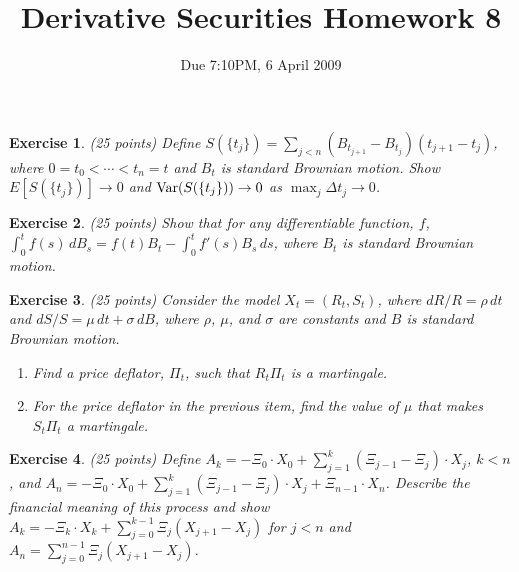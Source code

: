 \documentclass[11pt,fleqn]{amsproc}
\newcommand{\Var}{\mathop{\rm{Var}}}
\newtheorem{xca}{Exercise}
\begin{document}
\title{Derivative Securities Homework 8}
\author{Due 7:10PM, 6 April 2009}

\maketitle

\begin{xca}{(25 points)}
Define $S(\{t_j\}) = \sum_{j<n}(B_{t_{j+1}} - B_{t_j})(t_{j+1} - t_j)$, where $0 = t_0 < \cdots < t_n = t$
and $B_t$ is standard Brownian motion.
Show $E[S(\{t_j\})] \to 0$ and $\Var(S(\{t_j\})) \to 0$ as $\max_j \Delta t_j \to 0$.
\end{xca}

\begin{xca}{(25 points)}
Show that for any differentiable function, $f$, $\int_0^t f(s)\,dB_s = f(t)B_t - \int_0^t f'(s)B_s\,ds$,
where $B_t$ is standard Brownian motion.
\end{xca}

\begin{xca}{(25 points)}
Consider the model $X_t = (R_t, S_t)$, where $dR/R = \rho\,dt$ and $dS/S = \mu\,dt + \sigma\,dB$, where
$\rho$, $\mu$, and $\sigma$ are constants and $B$ is standard Brownian motion.
\begin{enumerate}
\item Find a price deflator, $\Pi_t$, such that $R_t\Pi_t$ is a martingale.
\item For the price deflator in the previous item, find the value of $\mu$
that makes $S_t\Pi_t$ a martingale.
\end{enumerate}
\end{xca}

\begin{xca}{(25 points)}
Define $A_k = -\Xi_0\cdot X_0 + \sum_{j=1}^k (\Xi_{j-1} - \Xi_j)\cdot X_j$, $k < n$, and
$A_n = -\Xi_0\cdot X_0 + \sum_{j=1}^k (\Xi_{j-1} - \Xi_j)\cdot X_j + \Xi_{n-1}\cdot X_n$.
Describe the financial meaning of this process and show
$A_k = -\Xi_k\cdot X_k + \sum_{j = 0}^{k - 1} \Xi_j (X_{j + 1} - X_j)$ for $j < n$
and $A_n = \sum_{j = 0}^{n - 1} \Xi_j (X_{j + 1} - X_j)$.
\end{xca}
\end{document}
